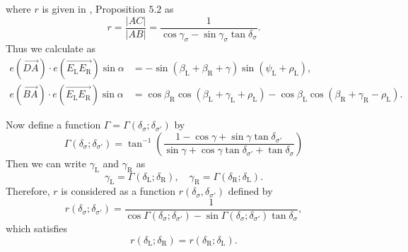 \documentclass[11pt]{amsart}
\numberwithin{equation}{section}
\numberwithin{theorem}{section}
\newcommand{\Lt}{\ensuremath{\mathrm{L}}}
\newcommand{\Rt}{\ensuremath{\mathrm{R}}}
\newcommand{\norm}[1]{\ensuremath{\left| #1 \right|}}
\newcommand{\ora}[1]{\ensuremath{\overrightarrow{#1}}}
\begin{document}
where $r$ is given in \cite{Doi19}, Proposition $5.2$ as
\begin{equation}\label{eq:r}
r=\frac{\norm{AC}}{\norm{AB}}=\frac{1}{\cos\gamma_\sigma -\sin\gamma_\sigma\tan\delta_\sigma}.
\end{equation}
Thus we calculate as
\begin{align}
\label{eq:DA_EE_1}
e(\ora{DA})\cdot e(\ora{E_\Lt E_\Rt})\sin\alpha&=-\sin(\beta_\Lt +\beta_\Rt +\gamma )\sin (\psi_\Lt +\rho_\Lt ),\\
\label{eq:BA_EE_1}
e(\ora{BA})\cdot e(\ora{E_\Lt E_\Rt})\sin\alpha&=\cos\beta_\Rt\cos (\beta_\Lt +\gamma_\Lt +\rho_\Lt ) -\cos\beta_\Lt\cos (\beta_\Rt +\gamma_\Rt -\rho_\Lt ).
\end{align}

Now define a function $\Gamma =\Gamma (\delta_\sigma ;\delta_{\sigma'})$ by
\begin{equation*}
\Gamma (\delta_\sigma ;\delta_{\sigma'})
=\tan^{-1}\left(\frac{1-\cos\gamma +\sin\gamma\tan\delta_{\sigma'}}{\sin\gamma +\cos\gamma\tan\delta_{\sigma'}+\tan\delta_\sigma}\right)
\end{equation*}
Then we can write $\gamma_\Lt$ and $\gamma_\Rt$ as
\begin{equation}\label{eq:Gamma_LR}
\gamma_\Lt =\Gamma (\delta_\Lt ;\delta_\Rt ),\quad\gamma_\Rt =\Gamma (\delta_\Rt ;\delta_\Lt ).
\end{equation}
Therefore, $r$ is considered as a function $r(\delta_\sigma ,\delta_{\sigma'})$ defined by
\begin{equation*}
r(\delta_\sigma ;\delta_{\sigma'})=\frac{1}{\cos\Gamma (\delta_\sigma ;\delta_{\sigma'})-\sin\Gamma (\delta_\sigma ;\delta_{\sigma'})\tan\delta_\sigma},
\end{equation*}
which satisfies 
\begin{equation}\label{eq:symmetry_r}
r(\delta_\Lt ;\delta_\Rt )=r(\delta_\Rt ;\delta_\Lt ).
\end{equation}
\end{document}
